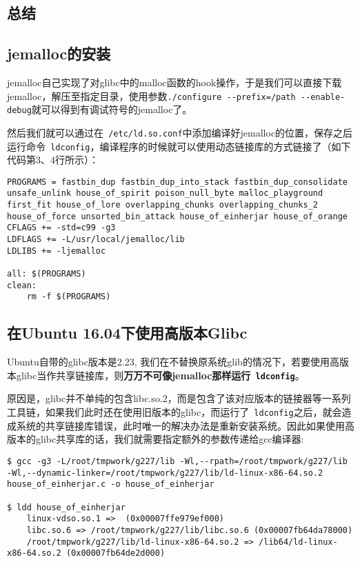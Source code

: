 \begin{center}
    \section{总结}
\end{center}

\setlength{\parindent}{2em}
\subsection{jemalloc的安装}
jemalloc自己实现了对glibc中的malloc函数的hook操作，于是我们可以直接下载jemalloc，解压至指定目录，使用参数\Verb+./configure --prefix=/path --enable-debug+就可以得到有调试符号的jemalloc了。

然后我们就可以通过在\Verb+ /etc/ld.so.conf+中添加编译好jemalloc的位置，保存之后运行命令\Verb+ ldconfig+，编译程序的时候就可以使用动态链接库的方式链接了（如下代码第3、4行所示）：
\begin{verbatim}
PROGRAMS = fastbin_dup fastbin_dup_into_stack fastbin_dup_consolidate unsafe_unlink house_of_spirit poison_null_byte malloc_playground first_fit house_of_lore overlapping_chunks overlapping_chunks_2 house_of_force unsorted_bin_attack house_of_einherjar house_of_orange
CFLAGS += -std=c99 -g3
LDFLAGS += -L/usr/local/jemalloc/lib
LDLIBS += -ljemalloc

all: $(PROGRAMS)
clean:
    rm -f $(PROGRAMS)
\end{verbatim}

\subsection{在Ubuntu 16.04下使用高版本Glibc}
Ubuntu自带的glibc版本是2.23, 我们在不替换原系统glib的情况下，若要使用高版本glibc当作共享链接库，则\textbf{万万不可像jemalloc那样运行\Verb+ ldconfig+}。

原因是，glibc并不单纯的包含libc.so.2，而是包含了该对应版本的链接器等一系列工具链，如果我们此时还在使用旧版本的glibc，而运行了\Verb+ ldconfig+之后，就会造成系统的共享链接库错误，此时唯一的解决办法是重新安装系统。因此如果使用高版本的glibc共享库的话，我们就需要指定额外的参数传递给gcc编译器: 
\begin{verbatim}
$ gcc -g3 -L/root/tmpwork/g227/lib -Wl,--rpath=/root/tmpwork/g227/lib -Wl,--dynamic-linker=/root/tmpwork/g227/lib/ld-linux-x86-64.so.2 house_of_einherjar.c -o house_of_einherjar

$ ldd house_of_einherjar                                                                                                                                                   
    linux-vdso.so.1 =>  (0x00007ffe979ef000)
    libc.so.6 => /root/tmpwork/g227/lib/libc.so.6 (0x00007fb64da78000)
    /root/tmpwork/g227/lib/ld-linux-x86-64.so.2 => /lib64/ld-linux-x86-64.so.2 (0x00007fb64de2d000)

\end{verbatim}

